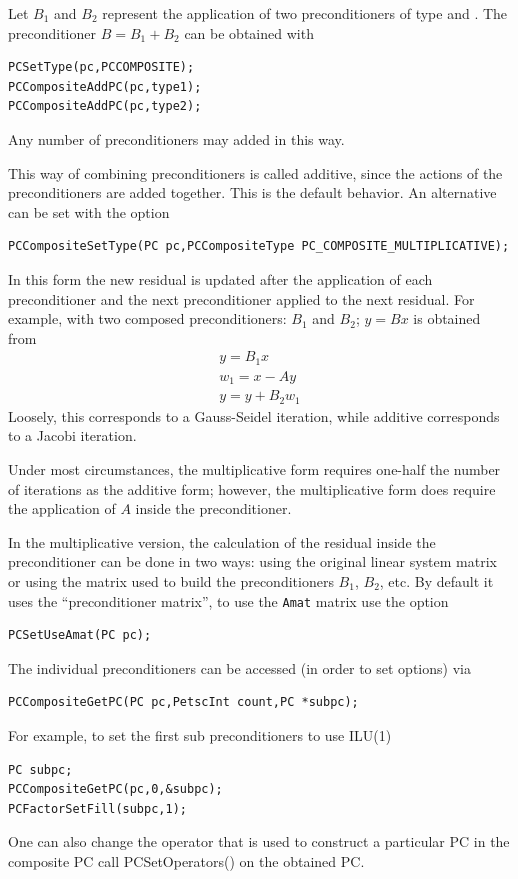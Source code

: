 Let $B_1$ and $B_2$ represent the application of two
preconditioners of type  and . The preconditioner
$ B = B_1 + B_2 $ can be obtained with
\begin{lstlisting}
PCSetType(pc,PCCOMPOSITE);
PCCompositeAddPC(pc,type1);
PCCompositeAddPC(pc,type2);
\end{lstlisting}
Any number of preconditioners may added in this way.

This way of combining preconditioners is called additive, since
the actions of the preconditioners are added together. This is the
default behavior. An alternative can be set with the option
\begin{lstlisting}
PCCompositeSetType(PC pc,PCCompositeType PC_COMPOSITE_MULTIPLICATIVE);
\end{lstlisting}
 
In this form the new residual is updated after the application of
each preconditioner and the next preconditioner applied to the next
residual. For example, with two composed preconditioners: $B_1$ and
$ B_2$; $ y = B x $ is obtained from
\begin{eqnarray*}
y    = B_1 x \\
w_1  = x - A y \\
y    = y + B_2 w_1
\end{eqnarray*}
Loosely, this corresponds to a Gauss-Seidel iteration, while
additive corresponds to a Jacobi iteration.

Under most circumstances, the multiplicative form requires one-half the number of
iterations as the additive form; however, the multiplicative form does require
the application of $ A $ inside the preconditioner.

In the multiplicative version, the calculation of the residual inside the
preconditioner can be done in two ways: using the original linear system matrix
or using the matrix used to build the preconditioners $B_1$, $B_2$, etc.
By default it uses the ``preconditioner matrix'', to use the \lstinline{Amat} matrix use the
option
\begin{lstlisting}
PCSetUseAmat(PC pc);
\end{lstlisting}

The individual
preconditioners can be accessed (in order to set options) via
\begin{lstlisting}
PCCompositeGetPC(PC pc,PetscInt count,PC *subpc);
\end{lstlisting}
For example, to set the first sub preconditioners to use ILU(1)
\begin{lstlisting}
PC subpc;
PCCompositeGetPC(pc,0,&subpc);
PCFactorSetFill(subpc,1);
\end{lstlisting}
One can also change the operator that is used to construct a particular PC in the composite PC call PCSetOperators() on the obtained PC.

